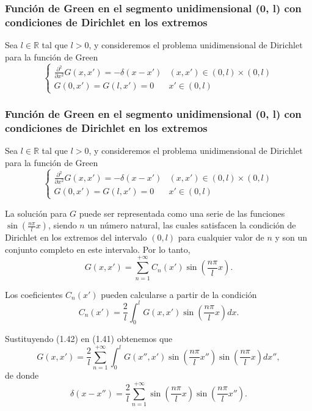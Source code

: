 \documentclass[12pt,a4paper]{book}
\begin{document}
\subsubsection{Función de Green en el segmento unidimensional (0, l) con condiciones de Dirichlet en los extremos}

Sea $l \in \mathbb{R}$ tal que $l > 0$, y consideremos el problema unidimensional de Dirichlet para la función de Green
\begin{equation}
\begin{cases}
\frac{\partial^2}{\partial x^2}G(x, x') = -\delta(x - x') & (x, x') \in (0, l) \times (0, l) \\
G(0, x') = G(l, x') = 0 & x' \in (0, l)
\end{cases}
\end{equation}

\subsubsection{Función de Green en el segmento unidimensional (0, l) con condiciones de Dirichlet en los extremos}

Sea $l \in \mathbb{R}$ tal que $l > 0$, y consideremos el problema unidimensional de Dirichlet para la función de Green
\begin{equation}
\begin{cases}
\frac{\partial^2}{\partial x^2}G(x, x') = -\delta(x - x') & (x, x') \in (0, l) \times (0, l) \\
G(0, x') = G(l, x') = 0 & x' \in (0, l)
\end{cases}
\end{equation}

La solución para $G$ puede ser representada como una serie de las funciones $\sin\left(\frac{n\pi}{l}x\right)$, siendo $n$ un número natural, las cuales satisfacen la condición de Dirichlet en los extremos del intervalo $(0, l)$ para cualquier valor de $n$ y son un conjunto completo en este intervalo. Por lo tanto,
\begin{equation}
G(x, x') = \sum_{n=1}^{+\infty} C_n(x') \sin\left(\frac{n\pi}{l}x\right).
\end{equation}

Los coeficientes $C_n(x')$ pueden calcularse a partir de la condición
\begin{equation}
C_n(x') = \frac{2}{l}\int_{0}^{l} G(x, x') \sin\left(\frac{n\pi}{l}x\right) dx.
\end{equation}

Sustituyendo (1.42) en (1.41) obtenemos que
\begin{equation}
G(x, x') = \frac{2}{l}\sum_{n=1}^{+\infty} \int_{0}^{l} G(x'', x') \sin\left(\frac{n\pi}{l}x''\right) \sin\left(\frac{n\pi}{l}x\right) dx'',
\end{equation}
de donde
\begin{equation}
\delta(x - x'') = \frac{2}{l}\sum_{n=1}^{+\infty} \sin\left(\frac{n\pi}{l}x\right) \sin\left(\frac{n\pi}{l}x''\right).
\end{equation}
\end{document}
